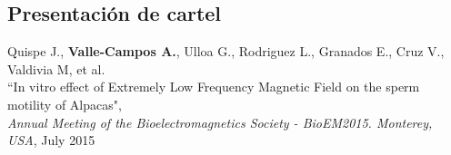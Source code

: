 \documentclass[margin,line]{res}
\begin{document}
\begin{resume}
		
		
		\section{\sc Presentación de cartel}
		
		Quispe J., \textbf{Valle-Campos A.}, Ulloa G., Rodriguez L., Granados E., Cruz V., Valdivia M, et al.\\ ``In vitro effect of Extremely Low Frequency Magnetic Field on the sperm motility of Alpacas", \\ {\em Annual Meeting of the Bioelectromagnetics Society - BioEM2015. Monterey, USA}, July 2015\\
		
		
		
		
		

\end{resume}
\end{document}
